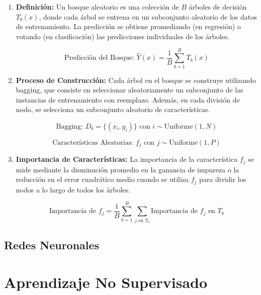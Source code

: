 \documentclass[12pt]{article}
\begin{document}
\begin{enumerate}
    \item \textbf{Definición:}
        Un bosque aleatorio es una colección de \(B\) árboles de decisión \(T_b(x)\), donde cada árbol se entrena en un subconjunto aleatorio de los datos de entrenamiento. La predicción se obtiene promediando (en regresión) o votando (en clasificación) las predicciones individuales de los árboles.

        \[ \textrm{Predicción del Bosque: } \hat{Y}(x) = \frac{1}{B} \sum_{b=1}^{B} T_b(x) \]

    \item \textbf{Proceso de Construcción:}
        Cada árbol en el bosque se construye utilizando bagging, que consiste en seleccionar aleatoriamente un subconjunto de las instancias de entrenamiento con reemplazo. Además, en cada división de nodo, se selecciona un subconjunto aleatorio de características.

        \[ \textrm{Bagging: } D_b = \{(x_i, y_i)\} \textrm{ con } i \sim \textrm{Uniforme}(1, N) \]

        \[ \textrm{Características Aleatorias: } f_j \textrm{ con } j \sim \textrm{Uniforme}(1, P) \]

    \item \textbf{Importancia de Características:}
        La importancia de la característica \(f_j\) se mide mediante la disminución promedio en la ganancia de impureza o la reducción en el error cuadrático medio cuando se utiliza \(f_j\) para dividir los nodos a lo largo de todos los árboles.

        \[ \textrm{Importancia de } f_j = \frac{1}{B} \sum_{b=1}^{B} \sum_{j \textrm{ en } T_b} \textrm{Importancia de } f_j \textrm{ en } T_b \]

\end{enumerate}    
    
\newpage
\subsection{Redes Neuronales}
\newpage
\section{Aprendizaje No Supervisado}

\end{document}

